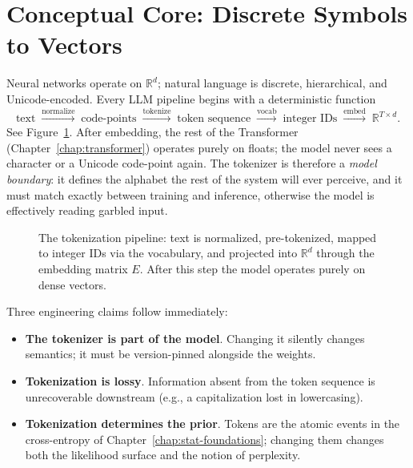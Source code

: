 \section{Conceptual Core: Discrete Symbols to Vectors}

Neural networks operate on $\mathbb{R}^d$; natural language is discrete,
hierarchical, and Unicode-encoded. Every LLM pipeline begins with a
deterministic function
\begin{equation}
\label{eq:ch4-pipeline}
\text{text} \;\xrightarrow{\text{normalize}}\;
\text{code-points} \;\xrightarrow{\text{tokenize}}\;
\text{token sequence} \;\xrightarrow{\text{vocab}}\;
\text{integer IDs} \;\xrightarrow{\text{embed}}\;
\mathbb{R}^{T \times d}.
\end{equation}
See Figure~\ref{fig:week3-pipeline}. After embedding, the rest of the
Transformer (Chapter~\ref{chap:transformer}) operates purely on floats; the model never sees a
character or a Unicode code-point again. The tokenizer is therefore a
\emph{model boundary}: it defines the alphabet the rest of the system
will ever perceive, and it must match exactly between training and
inference, otherwise the model is effectively reading garbled input.

\begin{figure}[h]
\centering

\caption{The tokenization pipeline: text is normalized, pre-tokenized,
  mapped to integer IDs via the vocabulary, and projected into
  $\mathbb{R}^d$ through the embedding matrix $E$.
  After this step the model operates purely on dense vectors.}
\label{fig:week3-pipeline}
\end{figure}

Three engineering claims follow immediately:
\begin{itemize}
  \item \textbf{The tokenizer is part of the model}. Changing it
        silently changes semantics; it must be version-pinned alongside
        the weights.
  \item \textbf{Tokenization is lossy}. Information absent from the
        token sequence is unrecoverable downstream (e.g., a
        capitalization lost in lowercasing).
  \item \textbf{Tokenization determines the prior}. Tokens are the
        atomic events in the cross-entropy of Chapter~\ref{chap:stat-foundations}; changing them
        changes both the likelihood surface and the notion of
        perplexity.
\end{itemize}


